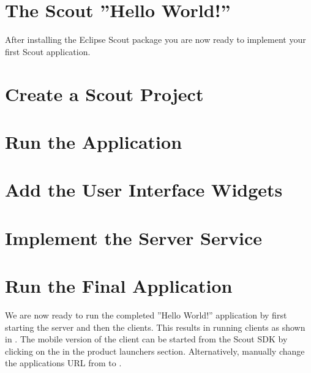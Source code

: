 \documentclass{article}
\begin{document}
\section*{The Scout ''Hello World!''}

After installing the Eclipse Scout package you are now ready to implement your first Scout application. 

\section*{Create a Scout Project}

\section*{Run the Application}

\section*{Add the User Interface Widgets}

\section*{Implement the Server Service}


\section*{Run the Final Application}

We are now ready to run the completed ''Hello World!'' application by first starting the server and then the clients. 
This results in running clients as shown in . 
The mobile version of the client can be started from the Scout SDK by clicking on the  in the product launchers section. 
Alternatively, manually change the applications URL from  to . 
\end{document}
